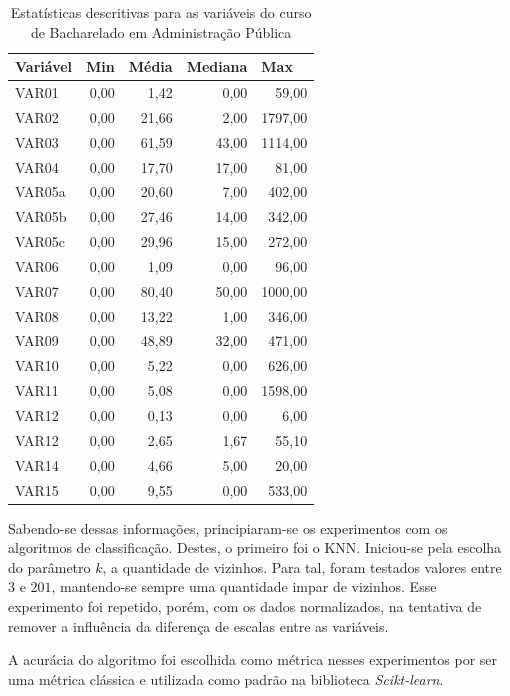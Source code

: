 \begin{table}[!htb]
  \centering
  \caption{Estatísticas descritivas para as variáveis do curso de Bacharelado em Administração Pública}
  \label{decribingStatisticsAdm}
  \begin{tabular}{@{}lrrrr@{}}
    \toprule
    \textbf{Variável} & \multicolumn{1}{l}{\textbf{Min}} & \multicolumn{1}{l}{\textbf{Média}} & \multicolumn{1}{l}{\textbf{Mediana}} & \multicolumn{1}{l}{\textbf{Max}} \\ \midrule
    VAR01 & 0,00 & 1,42 & 0,00 & 59,00 \\
    VAR02 & 0,00 & 21,66 & 2,00 & 1797,00 \\
    VAR03 & 0,00 & 61,59 & 43,00 & 1114,00 \\
    VAR04 & 0,00 & 17,70 & 17,00 & 81,00 \\
    VAR05a & 0,00 & 20,60 & 7,00 & 402,00 \\
    VAR05b & 0,00 & 27,46 & 14,00 & 342,00 \\
    VAR05c & 0,00 & 29,96 & 15,00 & 272,00 \\
    VAR06 & 0,00 & 1,09 & 0,00 & 96,00 \\
    VAR07 & 0,00 & 80,40 & 50,00 & 1000,00 \\
    VAR08 & 0,00 & 13,22 & 1,00 & 346,00 \\
    VAR09 & 0,00 & 48,89 & 32,00 & 471,00 \\
    VAR10 & 0,00 & 5,22 & 0,00 & 626,00 \\
    VAR11 & 0,00 & 5,08 & 0,00 & 1598,00 \\
    VAR12 & 0,00 & 0,13 & 0,00 & 6,00 \\
    VAR12 & 0,00 & 2,65 & 1,67 & 55,10 \\
    VAR14 & 0,00 & 4,66 & 5,00 & 20,00 \\
    VAR15 & 0,00 & 9,55 & 0,00 & 533,00 \\ \bottomrule
  \end{tabular}
\end{table}

Sabendo-se dessas informações, principiaram-se os experimentos com os algoritmos
de classificação. Destes, o primeiro foi o KNN. Iniciou-se pela escolha do
parâmetro \(k\), a quantidade de vizinhos. Para tal, foram testados valores
entre \(3\) e \(201\), mantendo-se sempre uma quantidade impar de vizinhos. Esse
experimento foi repetido, porém, com os dados normalizados, na tentativa de
remover a influência da diferença de escalas entre as variáveis.

A acurácia do algoritmo foi escolhida como métrica nesses experimentos por ser
uma métrica clássica e utilizada como padrão na biblioteca \textit{Scikt-learn}.


